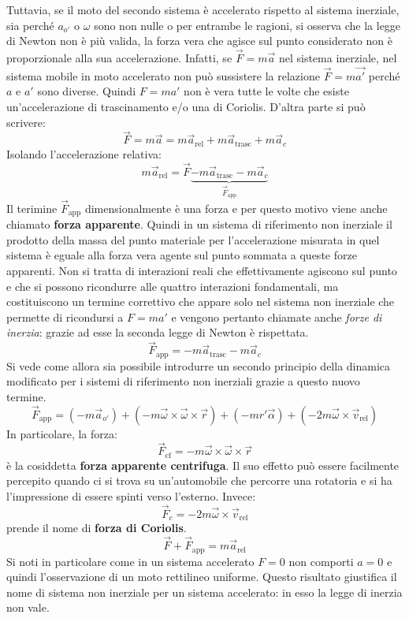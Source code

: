 \documentclass[10pt,a4paper]{book}
\begin{document}
Tuttavia, se il moto del secondo sistema è accelerato rispetto al sistema inerziale, sia perché $a_{o'}$ o $\omega$ sono non nulle o per entrambe le ragioni, si osserva che la legge di Newton non è più valida, la forza vera che agisce sul punto considerato non è proporzionale alla sua accelerazione. Infatti, se $\vec{F}=m\vec{a}$ nel sistema inerziale, nel sistema mobile in moto accelerato non può sussistere la relazione $\vec{F}=m\vec{a'}$ perché $a$ e $a'$ sono diverse.
Quindi $F=ma'$ non è vera tutte le volte che esiste un'accelerazione di trascinamento e/o una di Coriolis. D'altra parte si può scrivere:
\[
	\vec{F}=m\vec{a}=m\vec{a}_{\text{rel}}+m\vec{a}_{\text{trasc}}+m\vec{a}_c
\]
Isolando l'accelerazione relativa:
\[
	m\vec{a}_{\text{rel}}=\vec{F} \underbrace{-m\vec{a}_{\text{trasc}}-m\vec{a}_c}_{\vec{F}_{\text{app}}}
\]
Il terimine $\vec{F}_{\text{app}}$ dimensionalmente è una forza e per questo motivo viene anche chiamato \textbf{forza apparente}. Quindi in un sistema di riferimento non inerziale il prodotto della massa del punto materiale per l'accelerazione misurata in quel sistema è eguale alla forza vera agente sul punto sommata a queste forze apparenti. Non si tratta di interazioni reali che effettivamente agiscono sul punto e che si possono ricondurre alle quattro interazioni fondamentali, ma costituiscono un termine correttivo che appare solo nel sistema non inerziale che permette di ricondursi a $F=ma'$ e vengono pertanto chiamate anche \textit{forze di inerzia}: grazie ad esse la seconda legge di Newton è rispettata.
\[
	\vec{F}_{\text{app}}=-m\vec{a}_{\text{trasc}}-m\vec{a}_c
\]
Si vede come allora sia possibile introdurre un secondo principio della dinamica modificato per i sistemi di riferimento non inerziali grazie a questo nuovo termine.
\[
	\vec{F}_{\text{app}}=(-m\vec{a}_{o'})+(-m\vec{\omega}\times \vec{\omega} \times \vec{r})+(-mr'\vec{\alpha})+(-2m\vec{\omega} \times \vec{v}_{\text{rel}})
\]
In particolare, la forza:
\[
	\vec{F}_{\text{cf}}=-m\vec{\omega}\times \vec{\omega} \times \vec{r}
\]
è la cosiddetta \textbf{forza apparente centrifuga}. Il suo effetto può essere facilmente percepito quando ci si trova su un'automobile che percorre una rotatoria e si ha l'impressione di essere spinti verso l'esterno. Invece:
\[
	\vec{F}_c= -2m\vec{\omega} \times \vec{v}_{\text{rel}}
\]
prende il nome di \textbf{forza di Coriolis}.
\[
	\vec{F}+\vec{F}_{\text{app}}=m\vec{a}_{\text{rel}}
\]
Si noti in particolare come in un sistema accelerato $F=0$ non comporti $a=0$ e quindi l'osservazione di un moto rettilineo uniforme. Questo risultato giustifica il nome di sistema non inerziale per un sistema accelerato: in esso la legge di inerzia non vale.
\end{document}
